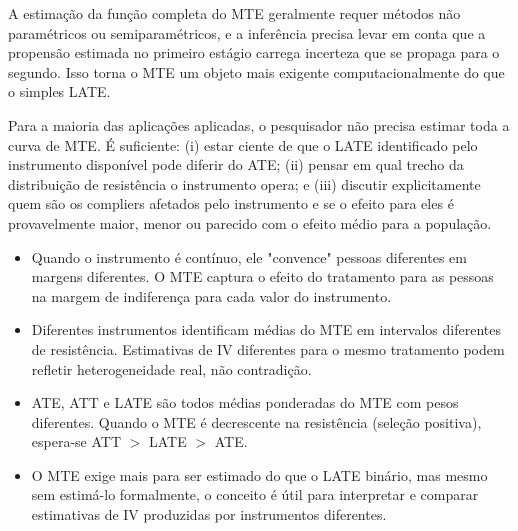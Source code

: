 A estimação da função completa do MTE geralmente requer métodos não paramétricos ou semiparamétricos, e a inferência precisa levar em conta que a propensão estimada no primeiro estágio carrega incerteza que se propaga para o segundo. Isso torna o MTE um objeto mais exigente computacionalmente do que o simples LATE.

Para a maioria das aplicações aplicadas, o pesquisador não precisa estimar toda a curva de MTE. É suficiente: (i) estar ciente de que o LATE identificado pelo instrumento disponível pode diferir do ATE; (ii) pensar em qual trecho da distribuição de resistência o instrumento opera; e (iii) discutir explicitamente quem são os compliers afetados pelo instrumento e se o efeito para eles é provavelmente maior, menor ou parecido com o efeito médio para a população.

\begin{notabox}
\begin{itemize}[leftmargin=*]
  \item Quando o instrumento é contínuo, ele "convence" pessoas diferentes em margens diferentes. O MTE captura o efeito do tratamento para as pessoas na margem de indiferença para cada valor do instrumento.
  \item Diferentes instrumentos identificam médias do MTE em intervalos diferentes de resistência. Estimativas de IV diferentes para o mesmo tratamento podem refletir heterogeneidade real, não contradição.
  \item ATE, ATT e LATE são todos médias ponderadas do MTE com pesos diferentes. Quando o MTE é decrescente na resistência (seleção positiva), espera-se ATT $>$ LATE $>$ ATE.
  \item O MTE exige mais para ser estimado do que o LATE binário, mas mesmo sem estimá-lo formalmente, o conceito é útil para interpretar e comparar estimativas de IV produzidas por instrumentos diferentes.
\end{itemize}
\end{notabox}
